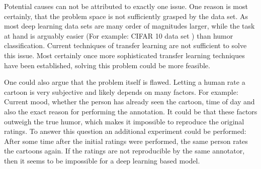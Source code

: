 \documentclass[draft,final,oneside]{vutinfth} %
\begin{document}
Potential causes can not be attributed to exactly one issue. One reason is most certainly, that the problem space is not sufficiently grasped by the data set. As most deep learning data sets are many order of magnitudes larger, while the task at hand is arguably easier (For example: CIFAR 10 data set \cite{dogsvscats}) than humor classification. Current techniques of transfer learning are not sufficient to solve this issue. Most certainly once more sophisticated transfer learning techniques have been established, solving this problem could be more feasible. 

One could also argue that the problem itself is flawed. Letting a human rate a
cartoon is very subjective and likely depends on many factors. For example: Current mood, whether the person has already seen the cartoon, time of day and also the exact reason for performing the annotation. It could be that these factors outweigh the true humor, which makes it impossible to reproduce the original ratings. To answer this question an additional experiment could be performed: After some time after the initial ratings were performed, the same person rates the cartoons again. If the ratings are not reproducible by the same annotator, then it seems to be impossible for a deep learning based model.




\backmatter

\listoffigures %








\end{document}
